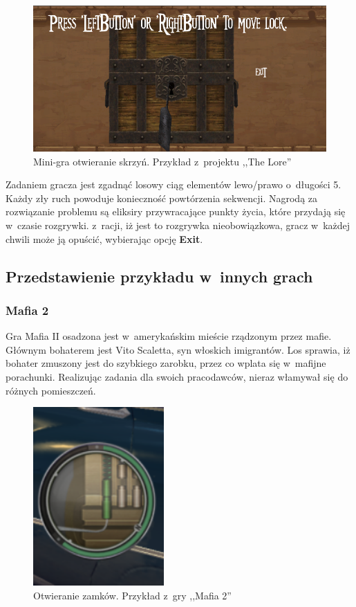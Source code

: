 \documentclass[oneside,polski,logo]{amuthesis}
\begin{document}
\begin{figure}[h]
	\centering
	\includegraphics[width=12cm]{images/tyrek/minigraskrzynia.png}
	\caption{Mini-gra otwieranie skrzyń. Przykład z~projektu ,,The Lore''}
\end{figure}

Zadaniem gracza jest zgadnąć losowy ciąg elementów lewo/prawo o~długości 5. Każdy zły ruch powoduje konieczność powtórzenia sekwencji. Nagrodą za rozwiązanie problemu są eliksiry przywracające punkty życia, które przydają się w~czasie rozgrywki. z~racji, iż jest to rozgrywka nieobowiązkowa, gracz w~każdej chwili może ją opuścić, wybierając opcję \textbf{Exit}.
\subsection{Przedstawienie przykładu w~innych grach}
\subsubsection{Mafia 2}
\par Gra Mafia II osadzona jest w~amerykańskim mieście rządzonym przez mafie. Głównym bohaterem jest Vito Scaletta, syn włoskich imigrantów. Los sprawia, iż bohater zmuszony jest do szybkiego zarobku, przez co wplata się w~mafijne porachunki. Realizując zadania dla swoich pracodawców, nieraz włamywał się do różnych pomieszczeń. 

\begin{figure}[h!]
	\centering
	\includegraphics[width=5cm]{images/tyrek/Mafia2.png}
	\caption{Otwieranie zamków. Przykład z~gry ,,Mafia 2''}
\end{figure}
\end{document}
